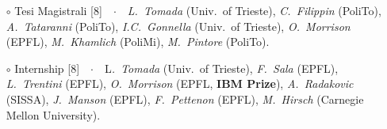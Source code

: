 \documentclass[
  usegeometry%
]{scrartcl}
\begin{document}
\begin{cv}{}
{\begin{itemize}
    \item[$\circ$] {\color{PineGreen}Tesi Magistrali} [8]\ \ $\cdotp$\ \  \textit{L.\ Tomada} (Univ.\ of Trieste), \textit{C.\ Filippin} (PoliTo), \textit{A.\ Tataranni} (PoliTo), \textit{I.C.\ Gonnella} (Univ.\ of Trieste), \textit{O.\ Morrison} (EPFL), \textit{M.\ Khamlich} (PoliMi), \textit{M.\ Pintore} (PoliTo).
    \item[$\circ$] {\color{NavyBlue}Internship} [8]\ \ $\cdotp$\ \  L\textit{.\ Tomada} (Univ.\ of Trieste), \textit{F.\ Sala} (EPFL), \textit{L.\ Trentini} (EPFL), \textit{O.\ Morrison} (EPFL, \textbf{IBM Prize}), \textit{A.\ Radakovic} (SISSA), \textit{J.\ Manson} (EPFL), \textit{F.\ Pettenon} (EPFL), \textit{M.\ Hirsch} (Carnegie Mellon University).
\end{itemize}}
\vspace{-0.5em}


\end{cv}
\end{document}
